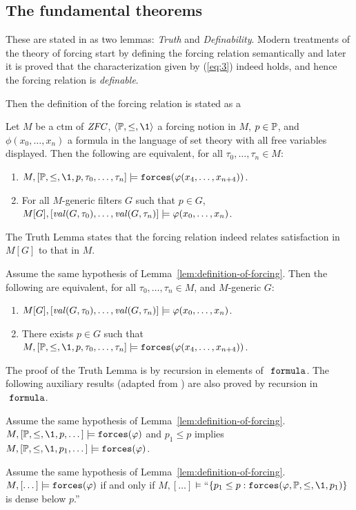 \subsection{The fundamental theorems}
These are stated in \cite{kunen2011set} as two lemmas: \emph{Truth} and
\emph{Definability}.  Modern treatments of the theory of forcing start
by defining the 
forcing relation semantically and later it is proved  that the
characterization given by (\ref{eq:3}) indeed holds, and hence the
forcing relation is \emph{definable}.

Then the definition of the forcing relation is stated as a
\begin{lemma}\label{lem:definition-of-forcing}
  Let $M$ be a ctm of $\mathit{ZFC}$, $\lb\PP,\leq,\1\rb$ a forcing notion
  in $M$, $p\in\mathbb{P}$, and $\phi(x_0,\dots,x_n)$ a formula in the
  language of set 
  theory with all free variables displayed. Then the
  following are equivalent, for all $\tau_0,\dots,\tau_n\in M$:
  \begin{enumerate}
  \item $M,[\PP,\leq,\1,p,\tau_0,\dots,\tau_n] 
  \models\forceisa(\phi(x_4,\dots,x_{n+4}))$.
  \item For all $M$-generic filters $G$ such that $p\in G$,
    $M[G],[\operatorname{\mathit{val}}(G,\tau_0),\dots,\operatorname{\mathit{val}}(G,\tau_n)] \models\varphi(x_0,\dots,x_n)$.
  \end{enumerate}
\end{lemma}
  
The Truth Lemma states that the forcing
relation indeed relates 
satisfaction in $M[G]$ to that in $M$. 
\begin{lemma}\label{lem:truth-lemma}
  Assume the same hypothesis of
  Lemma~\ref{lem:definition-of-forcing}. Then the
  following are equivalent, for all $\tau_0,\dots,\tau_n\in M$, and
  $M$-generic $G$: 
  \begin{enumerate}
  \item $M[G],[\operatorname{\mathit{val}}(G,\tau_0),\dots,\operatorname{\mathit{val}}(G,\tau_n)]
  \models\varphi(x_0,\dots,x_n)$.
  \item  There exists $p\in G$ such that $M,[\PP,\leq,\1,p,\tau_0,\dots,\tau_n] 
  \models\forceisa(\phi(x_4,\dots,x_{n+4}))$.
  \end{enumerate}
\end{lemma}
The proof of the Truth Lemma is by recursion in elements of
$\formula$. The following auxiliary results (adapted from
\cite[IV.2.43]{kunen2011set}) are also proved by recursion in
$\formula$.
\begin{lemma}[Strengthening]\label{lem:strengthen} 
  Assume the same hypothesis of Lemma~\ref{lem:definition-of-forcing}.
  $M, [\PP,\leq,\1,p,\dots]\models\forceisa(\phi)$ and $p_1\leq p$
  implies $M, [\PP,\leq,\1,p_1,\dots]\models\forceisa(\phi)$.
\end{lemma}
\begin{lemma}[Density]\label{lem:density}
  Assume the same hypothesis of
  Lemma~\ref{lem:definition-of-forcing}. $M,[\dots]\models\mathop{\mathtt{forces}}(\varphi)$ 
  if and only if 
  $M,[\dots]\models$``$\{p_1\leq p : \forceisa(\phi,\PP,\leq,\1,p_1)\}$ is
  dense below $p$.''
\end{lemma}

